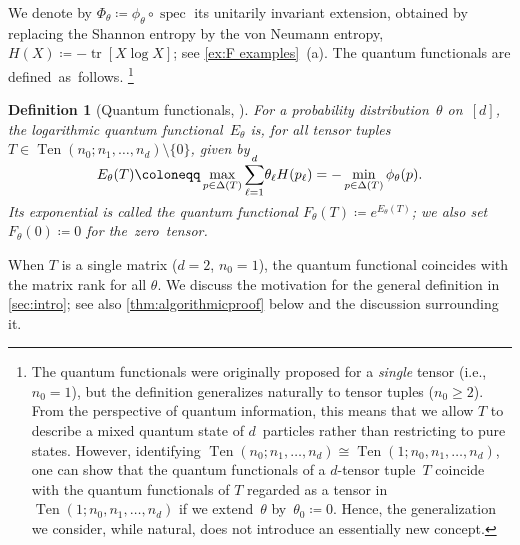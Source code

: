 \documentclass[11pt,letterpaper]{article}
\newtheorem{definition}[theorem]{Definition}\AddToHook{env/definition/begin}{\crefalias{theorem}{definition}}
\numberwithin{equation}{section}
\newcommand{\qfunc}{F}
\newcommand{\logqfunc}{E}
\DeclareMathOperator{\spec}{spec}
\DeclareMathOperator{\tr}{tr}
\DeclareMathOperator{\Ten}{Ten}
\begin{document}
We denote by $\Phi_\theta \coloneqq \phi_\theta \circ \spec$ its unitarily invariant extension, obtained by replacing the Shannon entropy by the von Neumann entropy, $H(X) \coloneqq -\tr[X \log X]$; see \cref{ex:F examples}~(a).
The quantum functionals are defined~as~follows.%
\footnote{\label{footnote:qfunc tensor tuple}The quantum functionals were originally proposed for a \emph{single} tensor (i.e., $n_0 = 1$), but the definition generalizes naturally to tensor tuples ($n_0 \ge 2$).
From the perspective of quantum information, this means that we allow $T$ to describe a mixed quantum state of $d$~particles rather than restricting to pure states.
However, identifying $\Ten(n_0; n_1, \ldots, n_d) \cong \Ten(1; n_0, n_1, \ldots, n_d)$, one can show that the quantum functionals of a $d$-tensor tuple~$T$ coincide with the quantum functionals of $T$ regarded as a tensor in~$\Ten(1; n_0, n_1, \ldots, n_d)$ if we extend~$\theta$ by~$\theta_0 \coloneqq 0$.
Hence, the generalization we consider, while natural, does not introduce an essentially new concept.}


\begin{definition}[Quantum functionals, \cite{CVZ2018}]\label{def:qfunc}
For a probability distribution~$\theta$ on~$[d]$, the \emph{logarithmic quantum functional}~$E_\theta$ is, for all tensor tuples~$T \in \Ten(n_0; n_1,\dots,n_d)\setminus\{0\}$, given by
\begin{align*}
    \logqfunc_\theta(T)
\coloneqq \max_{p\in\Delta(T)} \smash{\sum_{\ell=1}^d} \theta_\ell H(p_\ell)
= -\min_{p \in \Delta(T)}\phi_\theta(p).
\end{align*}
Its exponential is called the \emph{quantum functional} $\qfunc_\theta(T)
\coloneqq e^{\logqfunc_\theta(T)}$;
we also set %
$\qfunc_\theta(0) \coloneqq 0$ for the~zero~tensor.
\end{definition}

\noindent
When $T$ is a single matrix ($d=2$, $n_0=1$), the quantum functional coincides with the matrix rank for all $\theta$.
We discuss the motivation for the general definition in \cref{sec:intro}; see also \cref{thm:algorithmicproof} below and the discussion surrounding it.
\end{document}
